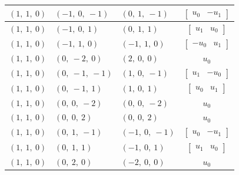 \documentclass[11pt]{article}
\theoremstyle{definition}
\begin{document}
\begin{longtable}{|l|l|l|c|}
    \hline
    $\left( 1, \  1, \  0\right)$ & $\left( -1, \  0, \  -1\right)$ & $\left( 0, \  1, \  -1\right)$ & $\left[\begin{matrix}u_{0} & - u_{1}\end{matrix}\right]$ \\
    \hline
    $\left( 1, \  1, \  0\right)$ & $\left( -1, \  0, \  1\right)$ & $\left( 0, \  1, \  1\right)$ & $\left[\begin{matrix}u_{1} & u_{0}\end{matrix}\right]$ \\
    \hline
    $\left( 1, \  1, \  0\right)$ & $\left( -1, \  1, \  0\right)$ & $\left( -1, \  1, \  0\right)$ & $\left[\begin{matrix}- u_{0} & u_{1}\end{matrix}\right]$ \\
    \hline
    $\left( 1, \  1, \  0\right)$ & $\left( 0, \  -2, \  0\right)$ & $\left( 2, \  0, \  0\right)$ & $u_{0}$ \\
    \hline
    $\left( 1, \  1, \  0\right)$ & $\left( 0, \  -1, \  -1\right)$ & $\left( 1, \  0, \  -1\right)$ & $\left[\begin{matrix}u_{1} & - u_{0}\end{matrix}\right]$ \\
    \hline
    $\left( 1, \  1, \  0\right)$ & $\left( 0, \  -1, \  1\right)$ & $\left( 1, \  0, \  1\right)$ & $\left[\begin{matrix}u_{0} & u_{1}\end{matrix}\right]$ \\
    \hline
    $\left( 1, \  1, \  0\right)$ & $\left( 0, \  0, \  -2\right)$ & $\left( 0, \  0, \  -2\right)$ & $u_{0}$ \\
    \hline
    $\left( 1, \  1, \  0\right)$ & $\left( 0, \  0, \  2\right)$ & $\left( 0, \  0, \  2\right)$ & $u_{0}$ \\
    \hline
    $\left( 1, \  1, \  0\right)$ & $\left( 0, \  1, \  -1\right)$ & $\left( -1, \  0, \  -1\right)$ & $\left[\begin{matrix}u_{0} & - u_{1}\end{matrix}\right]$ \\
    \hline
    $\left( 1, \  1, \  0\right)$ & $\left( 0, \  1, \  1\right)$ & $\left( -1, \  0, \  1\right)$ & $\left[\begin{matrix}u_{1} & u_{0}\end{matrix}\right]$ \\
    \hline
    $\left( 1, \  1, \  0\right)$ & $\left( 0, \  2, \  0\right)$ & $\left( -2, \  0, \  0\right)$ & $u_{0}$ \\

\end{longtable}
\end{document}
